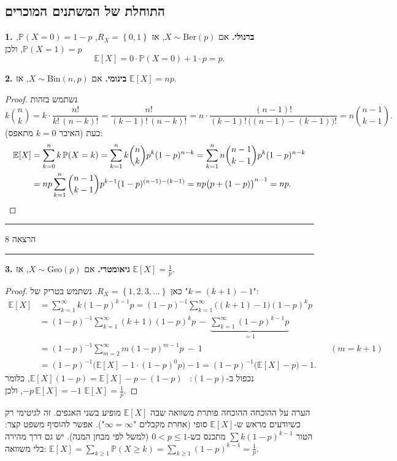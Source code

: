 \documentclass[11pt,a4paper]{report}
\newcommand{\flag}{\tikz[baseline=-0.1ex,x=0.9ex,y=0.9ex]{\draw[line width=0.5pt] (0,-0.3)--(0,1.6); \fill (0,1.6)--(1.2,1.2)--(0,0.8)--cycle;}}
\newcounter{todo}
\newcommand{\addtodo}[1]{\refstepcounter{todo}%
  \addcontentsline{tdo}{todo}{\protect\numberline{\thetodo}#1}}
\newcommand{\needcheck}[1]{\addtodo{#1}%
  {\color{todoc}\sffamily\small\,[\textbf{\flag{}\,\thetodo\ לבדיקה:} #1]\,}}
\renewcommand{\needcheck}[1]{}
\newcommand{\set}[1]{\left\{#1\right\}}
\newcommand{\PP}{\mathbb{P}}
\newcommand{\E}{\mathbb{E}}
\newcommand{\Ber}{\mathrm{Ber}}
\newcommand{\Bin}{\mathrm{Bin}}
\newcommand{\Geo}{\mathrm{Geo}}
\newcommand{\lecture}[1]{\par\medskip
  \begin{center}\color{exc}\sffamily\small
  \rule[0.5ex]{0.25\linewidth}{0.4pt}\quad הרצאה #1\quad\rule[0.5ex]{0.25\linewidth}{0.4pt}
  \end{center}\par}
\begin{document}
\subsection{התוחלת של המשתנים המוכרים}

\textbf{1. ברנולי.} אם $X\sim\Ber(p)$, אז $R_X=\set{0,1}$, $\PP(X=0)=1-p$, $\PP(X=1)=p$, ולכן
\[
  \E[X]=0\cdot\PP(X=0)+1\cdot p=p.
\]

\textbf{2. בינומי.} אם $X\sim\Bin(n,p)$, אז $\E[X]=np$.
\begin{proof}
נשתמש בזהות
\[
  k\binom nk=k\cdot\frac{n!}{k!\,(n-k)!}=\frac{n!}{(k-1)!\,(n-k)!}=n\cdot\frac{(n-1)!}{(k-1)!\,\big((n-1)-(k-1)\big)!}=n\binom{n-1}{k-1}.
\]
כעת (האיבר $k=0$ מתאפס):
\begin{align*}
  \E[X]&=\sum_{k=0}^nk\,\PP(X=k)=\sum_{k=1}^n k\binom nk p^k(1-p)^{n-k}
  =\sum_{k=1}^n n\binom{n-1}{k-1}p^k(1-p)^{n-k}\\
  &=np\sum_{k=1}^n\binom{n-1}{k-1}p^{k-1}(1-p)^{(n-1)-(k-1)}
  =np\big(p+(1-p)\big)^{n-1}=np.\qedhere
\end{align*}
\end{proof}
\needcheck{ברשימות ההוכחה לא הושלמה בכתב (יש תמונה של הלוח). השלמתי לפי מה שנראה בתמונה}

\lecture{8}

\textbf{3. גיאומטרי.} אם $X\sim\Geo(p)$, אז $\E[X]=\frac1p$.
\begin{proof}
כאן $R_X=\set{1,2,3,\dots}$. נשתמש בטריק של "$k=(k+1)-1$":
\begin{align*}
  \E[X]&=\sum_{k=1}^\infty k(1-p)^{k-1}p=(1-p)^{-1}\sum_{k=1}^\infty\big((k+1)-1\big)(1-p)^kp\\
  &=(1-p)^{-1}\sum_{k=1}^\infty(k+1)(1-p)^kp\ -\ \underbrace{\sum_{k=1}^\infty(1-p)^{k-1}p}_{=1}\\
  &=(1-p)^{-1}\sum_{m=2}^\infty m(1-p)^{m-1}p\ -\ 1 && (m=k+1)\\
  &=(1-p)^{-1}\big(\E[X]-1\cdot(1-p)^0p\big)-1=(1-p)^{-1}\big(\E[X]-p\big)-1.
\end{align*}
נכפול ב-$(1-p)$: \ $\E[X](1-p)=\E[X]-p-(1-p)$, כלומר $-p\,\E[X]=-1$, ולכן $\E[X]=\frac1p$.
\end{proof}

\begin{suggestion}{הערה על ההוכחה}
ההוכחה פותרת משוואה שבה $\E[X]$ מופיע בשני האגפים. זה לגיטימי רק כשיודעים מראש ש-$\E[X]$ סופי (אחרת מקבלים "$\infty=\infty$"). אפשר להוסיף משפט קצר: הטור $\sum k(1-p)^{k-1}$ מתכנס כש-$0<p\le1$ (למשל לפי מבחן המנה).
יש גם דרך מהירה בלי משוואה: $\E[X]=\sum_{k\ge1}\PP(X\ge k)=\sum_{k\ge1}(1-p)^{k-1}=\frac1p$.
\end{suggestion}
\end{document}
